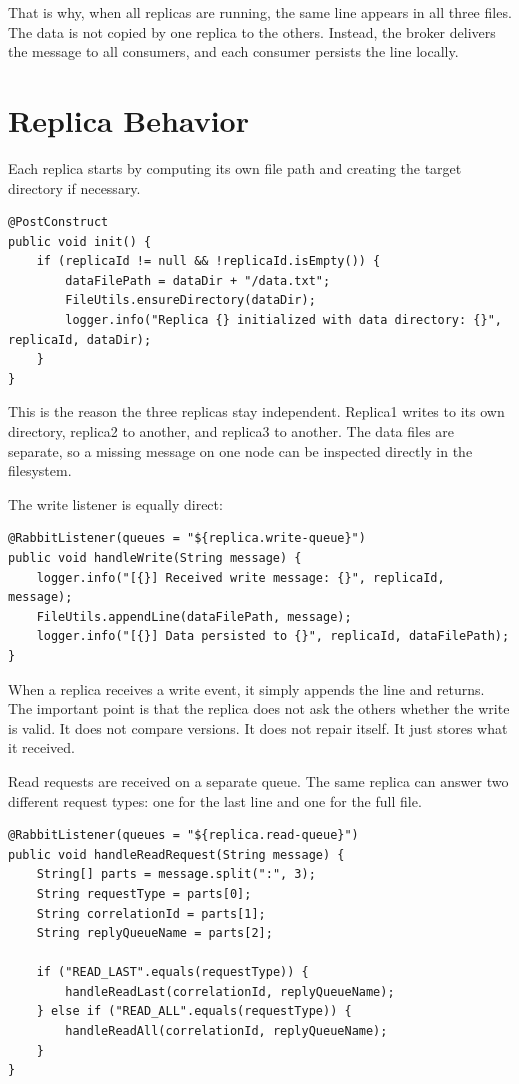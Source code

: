 \documentclass[11pt]{article}
\begin{document}
That is why, when all replicas are running, the same line appears in all three files. The data is not copied by one replica to the others. Instead, the broker delivers the message to all consumers, and each consumer persists the line locally.

\section{Replica Behavior}

Each replica starts by computing its own file path and creating the target directory if necessary.

\begin{lstlisting}
@PostConstruct
public void init() {
    if (replicaId != null && !replicaId.isEmpty()) {
        dataFilePath = dataDir + "/data.txt";
        FileUtils.ensureDirectory(dataDir);
        logger.info("Replica {} initialized with data directory: {}", replicaId, dataDir);
    }
}
\end{lstlisting}

This is the reason the three replicas stay independent. Replica1 writes to its own directory, replica2 to another, and replica3 to another. The data files are separate, so a missing message on one node can be inspected directly in the filesystem.

The write listener is equally direct:

\begin{lstlisting}
@RabbitListener(queues = "${replica.write-queue}")
public void handleWrite(String message) {
    logger.info("[{}] Received write message: {}", replicaId, message);
    FileUtils.appendLine(dataFilePath, message);
    logger.info("[{}] Data persisted to {}", replicaId, dataFilePath);
}
\end{lstlisting}

When a replica receives a write event, it simply appends the line and returns. The important point is that the replica does not ask the others whether the write is valid. It does not compare versions. It does not repair itself. It just stores what it received.

Read requests are received on a separate queue. The same replica can answer two different request types: one for the last line and one for the full file.

\begin{lstlisting}
@RabbitListener(queues = "${replica.read-queue}")
public void handleReadRequest(String message) {
    String[] parts = message.split(":", 3);
    String requestType = parts[0];
    String correlationId = parts[1];
    String replyQueueName = parts[2];

    if ("READ_LAST".equals(requestType)) {
        handleReadLast(correlationId, replyQueueName);
    } else if ("READ_ALL".equals(requestType)) {
        handleReadAll(correlationId, replyQueueName);
    }
}
\end{lstlisting}
\end{document}
